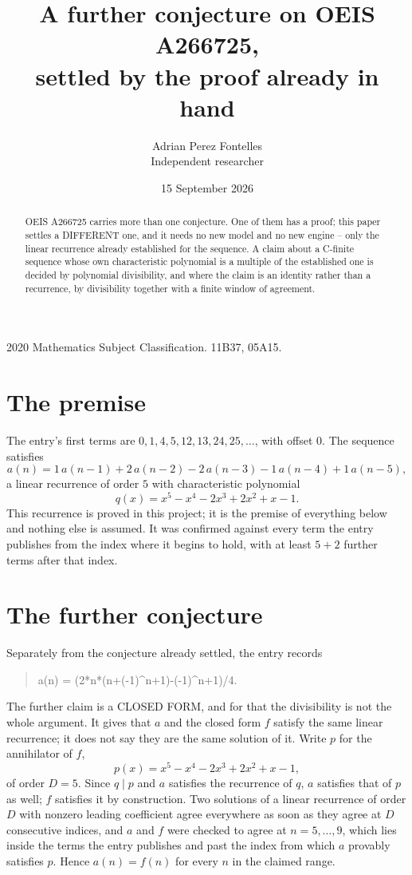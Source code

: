 \documentclass[11pt,a4paper]{article}
\title{A further conjecture on OEIS A266725,\\ \large settled by the proof already in hand}
\author{Adrian Perez Fontelles\\ \small Independent researcher}
\date{15 September 2026}
\theoremstyle{plain}
\theoremstyle{definition}
\begin{document}
\maketitle

\begin{abstract}
OEIS A266725 carries more than one conjecture. One of them has a proof; this paper settles a
DIFFERENT one, and it needs no new model and no new engine -- only the linear recurrence already
established for the sequence. A claim about a C-finite sequence whose own characteristic
polynomial is a multiple of the established one is decided by polynomial divisibility, and where
the claim is an identity rather than a recurrence, by divisibility together with a finite window
of agreement.
\end{abstract}

\noindent\small 2020 Mathematics Subject Classification. 11B37, 05A15.\normalsize

\section{The premise}

The entry's first terms are $0, 1, 4, 5, 12, 13, 24, 25,\dots$, with offset $0$. The sequence satisfies
\[
  a(n)=1\,a(n-1) + 2\,a(n-2) - 2\,a(n-3) - 1\,a(n-4) + 1\,a(n-5) ,
\]
a linear recurrence of order $5$ with characteristic polynomial
\[
  q(x)=x^{5} - x^{4} - 2 x^{3} + 2 x^{2} + x - 1 .
\]
This recurrence is proved in this project; it is the premise of everything below and nothing else is assumed.
It was confirmed against every term the entry publishes from the index where it begins to hold,
with at least $5+2$ further terms after that index.

\section{The further conjecture}

Separately from the conjecture already settled, the entry records

\begin{quote}\raggedright a(n) = (2*n*(n+(-1)\^{}n+1)-(-1)\^{}n+1)/4.\end{quote}

The further claim is a CLOSED FORM, and for that the divisibility is not the whole argument. It
gives that $a$ and the closed form $f$ satisfy the same linear recurrence; it does not say they
are the same solution of it. Write $p$ for the annihilator of $f$,
\[
  p(x)=x^{5} - x^{4} - 2 x^{3} + 2 x^{2} + x - 1 ,
\]
of order $D=5$. Since $q\mid p$ and $a$ satisfies the recurrence of $q$, $a$ satisfies that of
$p$ as well; $f$ satisfies it by construction. Two solutions of a linear recurrence of order $D$
with nonzero leading coefficient agree everywhere as soon as they agree at $D$ consecutive
indices, and $a$ and $f$ were checked to agree at $n=5,\dots,9$,
which lies inside the terms the entry publishes and past the index from which $a$ provably
satisfies $p$. Hence $a(n)=f(n)$ for every $n$ in the claimed range.
\end{document}
